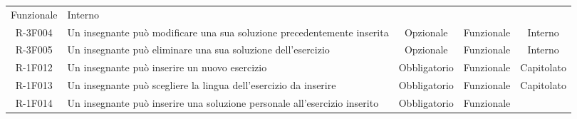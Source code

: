 \begin{tabularx}{\textwidth}{cXccc}
Funzionale &

Interno \\
R-3F004 &

Un insegnante può modificare una sua soluzione precedentemente inserita &

Opzionale &

Funzionale &

Interno \\
R-3F005 &

Un insegnante può eliminare una sua soluzione  dell’esercizio &

Opzionale &

Funzionale &

Interno \\
R-1F012 &

Un insegnante può inserire un nuovo esercizio &

Obbligatorio &

Funzionale &

Capitolato \\
R-1F013 &

Un insegnante può scegliere la lingua dell’esercizio da inserire &

Obbligatorio &

Funzionale &

Capitolato \\
R-1F014 &

Un insegnante può inserire una soluzione personale all’esercizio inserito &

Obbligatorio &

Funzionale &


\end{tabularx}
